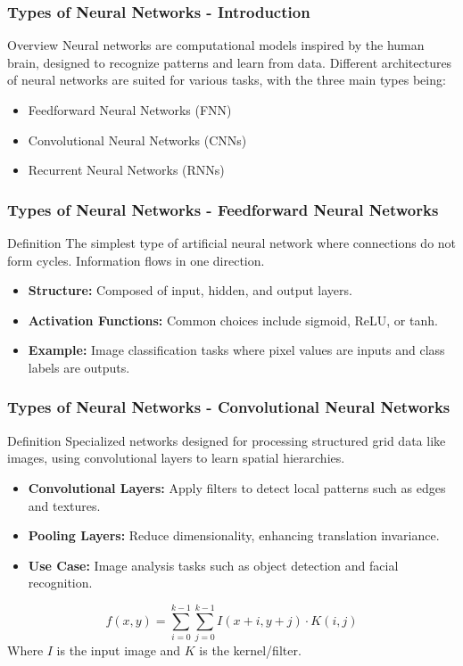 \documentclass[aspectratio=169]{beamer}
\begin{document}
\begin{frame}[fragile]
    \frametitle{Types of Neural Networks - Introduction}
    \begin{block}{Overview}
        Neural networks are computational models inspired by the human brain, designed to recognize patterns and learn from data. 
        Different architectures of neural networks are suited for various tasks, with the three main types being:
        \begin{itemize}
            \item Feedforward Neural Networks (FNN)
            \item Convolutional Neural Networks (CNNs)
            \item Recurrent Neural Networks (RNNs)
        \end{itemize}
    \end{block}
\end{frame}

\begin{frame}[fragile]
    \frametitle{Types of Neural Networks - Feedforward Neural Networks}
    \begin{block}{Definition}
        The simplest type of artificial neural network where connections do not form cycles. Information flows in one direction.
    \end{block}
    \begin{itemize}
        \item \textbf{Structure:} Composed of input, hidden, and output layers.
        \item \textbf{Activation Functions:} Common choices include sigmoid, ReLU, or tanh.
        \item \textbf{Example:} Image classification tasks where pixel values are inputs and class labels are outputs.
    \end{itemize}
\end{frame}

\begin{frame}[fragile]
    \frametitle{Types of Neural Networks - Convolutional Neural Networks}
    \begin{block}{Definition}
        Specialized networks designed for processing structured grid data like images, using convolutional layers to learn spatial hierarchies.
    \end{block}
    \begin{itemize}
        \item \textbf{Convolutional Layers:} Apply filters to detect local patterns such as edges and textures.
        \item \textbf{Pooling Layers:} Reduce dimensionality, enhancing translation invariance.
        \item \textbf{Use Case:} Image analysis tasks such as object detection and facial recognition.
    \end{itemize}
    \begin{equation}
        f(x, y) = \sum_{i=0}^{k-1} \sum_{j=0}^{k-1} I(x+i, y+j) \cdot K(i, j)
    \end{equation}
    Where \( I \) is the input image and \( K \) is the kernel/filter.
\end{frame}
\end{document}
